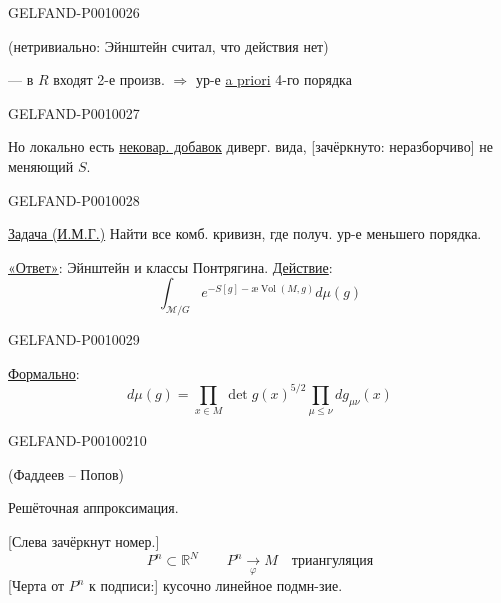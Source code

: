 \begin{GelfandAdjacentEvidence}{GELFAND-P001002}{6}


(нетривиально: Эйнштейн считал, что действия нет)

--- в $R$ входят 2-е произв. $\Rightarrow$ ур-е \underline{a priori} 4-го порядка
\end{GelfandAdjacentEvidence}
\begin{GelfandAdjacentEvidence}{GELFAND-P001002}{7}


Но локально есть \underline{нековар. добавок} диверг. вида, [зачёркнуто: неразборчиво] не меняющий $S$.
\end{GelfandAdjacentEvidence}
\begin{GelfandAdjacentEvidence}{GELFAND-P001002}{8}


\underline{Задача (И.М.Г.)} Найти все комб. кривизн, где получ. ур-е меньшего порядка.

\underline{«Ответ»}: Эйнштейн и классы Понтрягина. \underline{Действие}:
\begin{equation*}
\int_{\mathcal M/G}e^{-S[g]-\text{æ}\operatorname{Vol}(M,g)}d\mu(g)
\tag{9}
\end{equation*}
\end{GelfandAdjacentEvidence}
\begin{GelfandAdjacentEvidence}{GELFAND-P001002}{9}


\underline{Формально}:
\begin{equation*}
d\mu(g)=\prod_{x\in M}\det g(x)^{5/2}\prod_{\mu\leq\nu}dg_{\mu\nu}(x)
\tag{10}
\end{equation*}
\end{GelfandAdjacentEvidence}
\begin{GelfandAdjacentEvidence}{GELFAND-P001002}{10}

(Фаддеев -- Попов)

Решёточная аппроксимация.

[Слева зачёркнут номер.]
\[
P^n\subset\mathbb R^N\qquad
P^n\underset{\varphi}{\longrightarrow}M\quad\text{триангуляция}
\]
[Черта от $P^n$ к подписи:] кусочно линейное подмн-зие.
\end{GelfandAdjacentEvidence}



